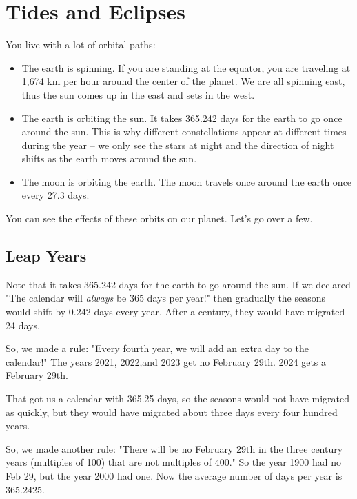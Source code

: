 \chapter{Tides and Eclipses}

You live with a lot of orbital paths:
\begin{itemize}

\item The earth is spinning.  If you are standing at the equator,  you are traveling at 1,674 km per hour around the center of the planet.  We are all spinning east,  thus the sun comes up in the east and sets in the west.

\item  The earth is orbiting the sun.    It takes 365.242 days for the earth to go once around the sun.  This is why different constellations appear at different times during the year -- we only see the stars at night and the direction of night shifts as the earth moves around the sun.  

\item The moon is orbiting the earth.   The moon travels once around the earth once every 27.3 days.  

\end{itemize}

You can see the effects of these orbits on our planet.  Let's go over a few.

\section{Leap Years}

Note that it takes 365.242 days for the earth to go around the sun.  If we declared "The calendar will \emph{always} be 365 days per year!"  then gradually the seasons would shift by 0.242 days every year.  After a century,  they would have migrated 24 days.

So, we made a rule: "Every fourth year,  we will add an extra day to the calendar!"  The years 2021, 2022,and 2023 get no February 29th.  2024 gets a February 29th.

That got us a calendar with 365.25 days, so the seasons would not have migrated as quickly,  but they would
have migrated about three days every four hundred years.

So, we made another rule: "There will be no February 29th in the three century years (multiples of 100) that are not multiples of 400."  So the year 1900 had no Feb 29,  but the year 2000 had one.   Now the average number of days per year is 365.2425.

